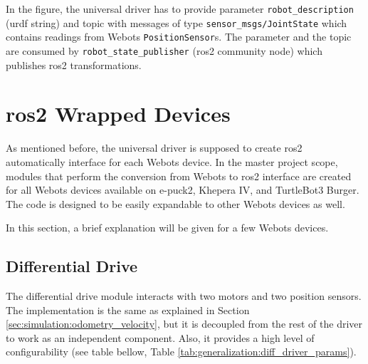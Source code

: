 In the figure, the universal driver has to provide parameter \texttt{robot\_description} (\ac{urdf} string) and topic with messages of type \texttt{sensor\_msgs/JointState} which contains readings from Webots \texttt{PositionSensor}s.
The parameter and the topic are consumed by \texttt{robot\_state\_publisher} (\ac{ros2} community node) which publishes \ac{ros2} transformations.

\section{\ac{ros2} Wrapped Devices}
As mentioned before, the universal driver is supposed to create \ac{ros2} automatically interface for each Webots device.
In the master project scope, modules that perform the conversion from Webots to \ac{ros2} interface are created for all Webots devices available on e-puck2, Khepera IV, and TurtleBot3 Burger.
The code is designed to be easily expandable to other Webots devices as well.

In this section, a brief explanation will be given for a few Webots devices.

\subsection{Differential Drive}
The differential drive module interacts with two motors and two position sensors.
The implementation is the same as explained in Section \ref{sec:simulation:odometry_velocity}, but it is decoupled from the rest of the driver to work as an independent component.
Also, it provides a high level of configurability (see table bellow, Table \ref{tab:generalization:diff_driver_params}).

